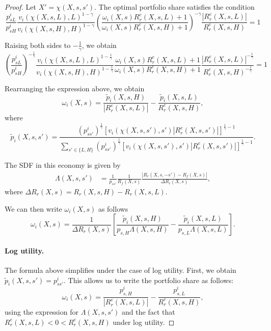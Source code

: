 \begin{proof}
Let $X' =\chi(X,s,s')$. 
The optimal portfolio share satisfies the condition
\begin{equation}
    \frac{p_{sL}^i}{p_{sH}^i} \frac{v_i(\chi(X,s,L), L)^{1-\gamma} }{v_i(\chi(X,s,H), H)^{1-\gamma} }\left( \frac{\omega_i(X,s) R_r^e(X,s,L) + 1  }{\omega_i(X,s) R_r^e(X,s,H) + 1  }\right)^{-\gamma}\frac{|R_r^e(X,s,L)|}{R_r^e(X,s,H)} = 1
\end{equation}

Raising both sides to $-\frac{1}{\gamma}$, we obtain
\begin{equation}
    \left(\frac{p_{sL}^i}{p_{sH}^i}\right)^{-\frac{1}{\gamma}} \frac{v_i(\chi(X,s,L), L)^{1-\frac{1}{\gamma}} }{v_i(\chi(X,s,H), H)^{1-\frac{1}{\gamma}} } \frac{\omega_i(X,s) R_r^e(X,s,L) + 1  }{\omega_i(X,s) R_r^e(X,s,H) + 1 }\frac{|R_r^e(X,s,L)|^{-\frac{1}{\gamma}}}{R_r^e(X,s,H)^{-\frac{1}{\gamma}}} = 1
\end{equation}

Rearranging the expression above, we obtain
\begin{equation}\label{app:omega_returns}
\omega_{i}(X,s) =  \frac{\tilde{p}_i(X,s,H)}{|R_r^e(X,s,L)|} -  \frac{\tilde{p}_i(X,s,L)}{R_r^e(X,s,H)}, 
\end{equation}
where
\begin{equation}
    \tilde{p}_{i}(X,s,s') = \frac{(p_{ss'}^i)^{\frac{1}{\gamma}} \left[ v_{i}(\chi(X,s,s'),s') |R_r^e(X,s,s')| \right]^{\frac{1}{\gamma}-1}}{\sum_{s'\in \{L,H\} } (p_{ss'}^i)^{\frac{1}{\gamma}} \left[ v_{i}(\chi(X,s,s'),s') |R_r^e(X,s,s')| \right]^{\frac{1}{\gamma}-1} }.
\end{equation}

The SDF in this economy is given by
\begin{align}
    \Lambda(X,s,s') &= \frac{1}{p_{ss'}} \frac{1}{R_f(X,s)} \frac{|R_r(X,s,-s')-R_f(X,s)|}{\Delta R_{r}(X,s)},
\end{align}
where $\Delta R_r(X,s) = R_r(X,s,H) - R_r(X,s,L)$.

We can then write $\omega_{i}(X,s)$  as follows
\begin{equation}
    \omega_i(X,s) = \frac{1}{\Delta R_r(X,s)} \left[\frac{\tilde{p}_i(X,s,H)}{p_{s,H} \Lambda(X,s,H)}  -\frac{\tilde{p}_i(X,s,L)}{p_{s,L}\Lambda(X,s,L)} \right].
\end{equation}

\paragraph{Log utility.} The formula above simplifies under the case of log utility. 
First, we obtain $\tilde{p}_i(X,s,s') = p_{ss'}^i$. This allows us to write the portfolio share as follows:
\begin{equation}
    \omega_i(X,s) = \frac{p_{s,H}^i}{|R_r^e(X,s,L)|}  -\frac{p_{s,L}^i}{R_r^e(X,s,H)},
\end{equation}
using the expression for $\Lambda(X,s,s')$ and the fact that $R_r^e(X,s,L) < 0 < R_r^e(X,s,H)$ under log utility.


\end{proof}
